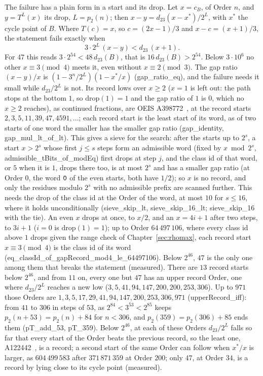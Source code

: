 \documentclass[10pt,a4paper,titlepage]{article}
\newcommand{\lean}[1]{\textsf{#1}}
\begin{document}
The failure has a plain form in a start and its drop. Let $x = c_B$, of Order $n$, and $y =
T^{L}(x)$ its drop, $L = p_2(n)$; then $x - y = d_{23}(x - x^*)/2^{L}$, with $x^*$ the
cycle point of $B$. Where $T(c) = x$, so $c = (2x-1)/3$ and $x - c = (x+1)/3$, the
statement fails exactly when
\[
3 \cdot 2^{L}\,(x - y) < d_{23}\,(x + 1).
\]
For $47$ this reads $3 \cdot 2^{54} < 48\,d_{23}(B)$, that is $16\,d_{23}(B) > 2^{54}$. Below $3 \cdot
10^6$ no other $x \equiv 3 \pmod 4$ meets it, even without $x \equiv 2 \pmod 3$. The gap
ratio $(x - y)/x$ is $(1 - 3^n/2^{L})(1 - x^*/x)$ (\lean{gap\_ratio\_eq}), and the failure needs it small while
$d_{23}/2^{L}$ is not. Its record lows over $x \ge 2$ ($x = 1$ is left out: the path stops at the bottom $1$, so
$\mathrm{drop}(1) = 1$ and the gap ratio of $1$ is $0$, which no $x \ge 2$ reaches), as continued fractions, are OEIS
A398772~\cite{OEIS_A398772}, at the record starts
$2, 3, 5, 11, 39, 47, 4591, \ldots$; each record start is the least start of its
word, as of two starts of one word the smaller has the smaller gap ratio
(\lean{gap\_identity}, \lean{gap\_mul\_lt\_of\_lt}). This gives a sieve for the search:
after the starts up to $2^s$, a start $x > 2^s$ whose first $j \le s$ steps form an admissible
word (fixed by $x \bmod 2^s$, \lean{admissible\_tBits\_of\_modEq}) first drops at step $j$,
and the class id of that word, or $5$ when it is $1$, drops there too, is at most $2^s$ and has
a smaller gap ratio (at Order $0$, the word $\text{\texttt{0}}$ of the even starts, both have $1/2$); so
$x$ is no record, and only the residues modulo $2^s$ with no
admissible prefix are scanned further. This needs the drop of the class id at the Order of the
word, at most $10$ for $s \le 16$, where it holds unconditionally
(\lean{sieve\_skip\_lt}, \lean{sieve\_skip\_16\_lt}; \lean{sieve\_skip\_16} with the tie). An even $x$ drops at once, to $x/2$, and
an $x = 4i + 1$ after two steps, to $3i + 1$ ($i = 0$ is $\mathrm{drop}(1) = 1$); up to Order $64\,497\,106$, where every class id
above $1$ drops given the range check of Chapter~\ref{sec:rhomax}, each record start $x \equiv 3 \pmod 4$ is the class id of its word
(\lean{eq\_classId\_of\_gapRecord\_mod4\_le\_64497106}). Below $2^{46}$, $47$ is the only one among them that
breaks the statement (measured). There are $13$ record starts below $2^{46}$, and from
$11$ on, every one but $47$ has an upper record Order, one where $d_{23}/2^{L}$ reaches a new
low ($3, 5, 41, 94, 147, 200, 200, 253, 306$). Up to $971$ those Orders are $1, 3, 5, 17, 29,
41, 94, 147, 200, 253, 306, 971$ (\lean{upperRecord\_iff}): from $41$ to $306$ in steps of $53$,
as $2^{84} < 3^{53} < 2^{85}$ keeps $p_2(n + 53) = p_2(n) + 84$ for $n < 306$, and
$p_2(359) = p_2(306) + 85$ ends them (\lean{pT\_add\_53}, \lean{pT\_359}). Below $2^{46}$, at each of these Orders $d_{23}/2^{L}$ falls so far that
every start of the Order beats the previous record, so the least one, A122442~\cite{OEIS_A122442}, is a
record; a second start of the same Order can follow when $x^*/x$ is larger, as
$604\,499\,583$ after $371\,871\,359$ at Order $200$; only $47$, at Order $34$, is a record
by lying close to its cycle point (measured).
\end{document}
